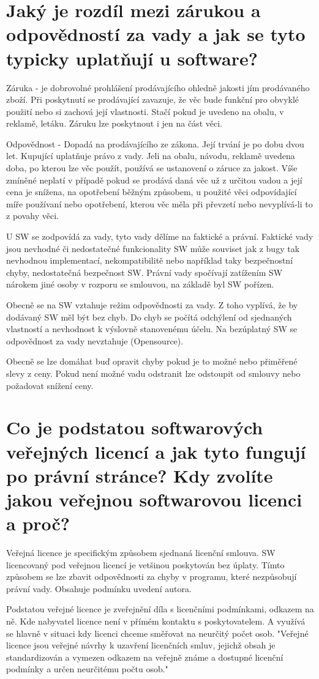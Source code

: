 \documentclass[12pt,a4paper,czech]{article}
\newcommand{\nadpis}[1]{{\section{#1}}}
\begin{document}
\newpage
\nadpis{Jaký je rozdíl mezi zárukou a odpovědností za vady a jak se tyto typicky uplatňují u software?}

Záruka - je dobrovolné prohlášení prodávajícího ohledně jakosti jím prodávaného zboží. Při poskytnutí se prodávající zavazuje, že věc bude funkční pro obvyklé použití nebo si zachová její vlastnosti. Stačí pokud je uvedeno na obalu, v reklamě, letáku. Záruku lze poskytnout i jen na část věci.

Odpovědnost - Dopadá na prodávajícího ze zákona. Její trvání je po dobu dvou let. Kupující uplatňuje právo z vady. Jeli na obalu, návodu, reklamě uvedena doba, po kterou lze věc použít, používá se ustanovení o záruce za jakost. Víše zmíněné neplatí v případě pokud se prodává daná věc už z určitou vadou a její cena je snížena, na opotřebení běžným způsobem, u použité věci odpovídající míře používaní nebo opotřebení, kterou věc měla při převzetí nebo nevyplívá-li to z povahy věci.

U SW se zodpovídá za vady,  tyto vady dělíme na faktické a právní. Faktické vady jsou nevhodné či nedostatečné funkcionality SW může souviset jak z bugy tak nevhodnou implementací, nekompatibilitě nebo například taky bezpečnostní chyby, nedostatečná bezpečnost SW. Právní vady spočívají zatížením SW nárokem jiné osoby v rozporu se smlouvou, na základě byl SW pořízen. 

Obecně se na SW vztahuje režim odpovědnosti za vady. Z toho vyplívá, že by dodávaný SW měl být bez chyb. Do chyb se počítá odchýlení od sjednaných vlastností a nevhodnost k výslovně stanovenému účelu. Na bezúplatný SW se odpovědnost za vady nevztahuje (Opensource). 

Obecně se lze domáhat buď opravit chyby pokud je to možné nebo přiměřené slevy z ceny. Pokud není možné vadu odstranit lze odstoupit od smlouvy nebo požadovat snížení ceny.


\vspace{0.5cm} 
\nadpis{Co je podstatou softwarových veřejných licencí a jak tyto fungují po právní stránce? Kdy zvolíte jakou veřejnou softwarovou licenci a proč?}

Veřejná licence je specifickým způsobem sjednaná licenční smlouva. SW licencovaný pod veřejnou licencí je vetšinou poskytován bez úplaty. Tímto způsobem se lze zbavit odpovědnosti za chyby v programu, které nezpůsobují právní vady. Obsahuje podmínku uvedení autora. 

Podstatou veřejné licence je zveřejnění díla s licenčními podmínkami, odkazem na ně. Kde nabyvatel licence není v přímém kontaktu s poskytovatelem. A využívá se hlavně v situaci kdy licenci chceme směřovat na neurčitý počet osob.
"Veřejné licence jsou veřejné návrhy k uzavření licenčních smluv, jejichž obsah je standardizován a vymezen odkazem na veřejně známe a dostupné licenční podmínky a určen neurčitému počtu osob."
\end{document}

